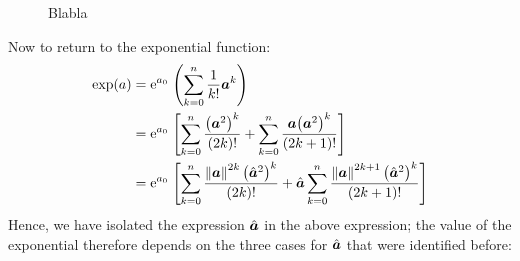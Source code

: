 \begin{figure}
    \centering
    
    \caption{Blabla}
    \label{fig:root_locus}
\end{figure}


Now to return to the exponential function:
\begin{equation}
    \begin{split}
        \exp(a) &= \ec^{a_0}\;\qty(\sum_{k=0}^n \frac{1}{k!} \vec{a}^k) \\
                &= \ec^{a_0}\;\qty[\sum_{k=0}^n \frac{\qty(\vec{a}^2)^k}{(2k)!}  + \sum_{k=0}^n \frac{\vec{a}\qty(\vec{a}^2)^k}{(2k+1)!}] \\
                &= \ec^{a_0}\;\qty[\sum_{k=0}^n \frac{\norm{\vec{a}}^{2k}\, \qty(\uvec{a}^2)^k}{(2k)!}  + \uvec{a}\sum_{k=0}^n \frac{\norm{\vec{a}}^{2k + 1} \, \qty(\uvec{a}^2)^k}{(2k+1)!}] \\
    \end{split}
\end{equation}
Hence, we have isolated the expression $\uvec{a}$ in the above expression; the value of the exponential therefore depends on the three cases for $\uvec{a}$ that were identified before:
